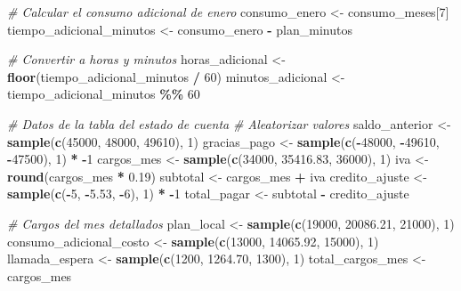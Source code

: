 \documentclass[
]{article}
\newenvironment{Shaded}{\begin{snugshade}}{\end{snugshade}}
\newcommand{\CommentTok}[1]{\textcolor[rgb]{0.56,0.35,0.01}{\textit{#1}}}
\newcommand{\DecValTok}[1]{\textcolor[rgb]{0.00,0.00,0.81}{#1}}
\newcommand{\FloatTok}[1]{\textcolor[rgb]{0.00,0.00,0.81}{#1}}
\newcommand{\FunctionTok}[1]{\textcolor[rgb]{0.13,0.29,0.53}{\textbf{#1}}}
\newcommand{\NormalTok}[1]{#1}
\newcommand{\OtherTok}[1]{\textcolor[rgb]{0.56,0.35,0.01}{#1}}
\newcommand{\SpecialCharTok}[1]{\textcolor[rgb]{0.81,0.36,0.00}{\textbf{#1}}}
\begin{document}
\begin{Shaded}
\begin{Highlighting}[]
\CommentTok{\# Calcular el consumo adicional de enero}
\NormalTok{consumo\_enero }\OtherTok{\textless{}{-}}\NormalTok{ consumo\_meses[}\DecValTok{7}\NormalTok{]}
\NormalTok{tiempo\_adicional\_minutos }\OtherTok{\textless{}{-}}\NormalTok{ consumo\_enero }\SpecialCharTok{{-}}\NormalTok{ plan\_minutos}

\CommentTok{\# Convertir a horas y minutos}
\NormalTok{horas\_adicional }\OtherTok{\textless{}{-}} \FunctionTok{floor}\NormalTok{(tiempo\_adicional\_minutos }\SpecialCharTok{/} \DecValTok{60}\NormalTok{)}
\NormalTok{minutos\_adicional }\OtherTok{\textless{}{-}}\NormalTok{ tiempo\_adicional\_minutos }\SpecialCharTok{\%\%} \DecValTok{60}

\CommentTok{\# Datos de la tabla del estado de cuenta}
\CommentTok{\# Aleatorizar valores}
\NormalTok{saldo\_anterior }\OtherTok{\textless{}{-}} \FunctionTok{sample}\NormalTok{(}\FunctionTok{c}\NormalTok{(}\DecValTok{45000}\NormalTok{, }\DecValTok{48000}\NormalTok{, }\DecValTok{49610}\NormalTok{), }\DecValTok{1}\NormalTok{)}
\NormalTok{gracias\_pago }\OtherTok{\textless{}{-}} \FunctionTok{sample}\NormalTok{(}\FunctionTok{c}\NormalTok{(}\SpecialCharTok{{-}}\DecValTok{48000}\NormalTok{, }\SpecialCharTok{{-}}\DecValTok{49610}\NormalTok{, }\SpecialCharTok{{-}}\DecValTok{47500}\NormalTok{), }\DecValTok{1}\NormalTok{) }\SpecialCharTok{*} \SpecialCharTok{{-}}\DecValTok{1}
\NormalTok{cargos\_mes }\OtherTok{\textless{}{-}} \FunctionTok{sample}\NormalTok{(}\FunctionTok{c}\NormalTok{(}\DecValTok{34000}\NormalTok{, }\FloatTok{35416.83}\NormalTok{, }\DecValTok{36000}\NormalTok{), }\DecValTok{1}\NormalTok{)}
\NormalTok{iva }\OtherTok{\textless{}{-}} \FunctionTok{round}\NormalTok{(cargos\_mes }\SpecialCharTok{*} \FloatTok{0.19}\NormalTok{)}
\NormalTok{subtotal }\OtherTok{\textless{}{-}}\NormalTok{ cargos\_mes }\SpecialCharTok{+}\NormalTok{ iva}
\NormalTok{credito\_ajuste }\OtherTok{\textless{}{-}} \FunctionTok{sample}\NormalTok{(}\FunctionTok{c}\NormalTok{(}\SpecialCharTok{{-}}\DecValTok{5}\NormalTok{, }\SpecialCharTok{{-}}\FloatTok{5.53}\NormalTok{, }\SpecialCharTok{{-}}\DecValTok{6}\NormalTok{), }\DecValTok{1}\NormalTok{) }\SpecialCharTok{*} \SpecialCharTok{{-}}\DecValTok{1}
\NormalTok{total\_pagar }\OtherTok{\textless{}{-}}\NormalTok{ subtotal }\SpecialCharTok{{-}}\NormalTok{ credito\_ajuste}

\CommentTok{\# Cargos del mes detallados}
\NormalTok{plan\_local }\OtherTok{\textless{}{-}} \FunctionTok{sample}\NormalTok{(}\FunctionTok{c}\NormalTok{(}\DecValTok{19000}\NormalTok{, }\FloatTok{20086.21}\NormalTok{, }\DecValTok{21000}\NormalTok{), }\DecValTok{1}\NormalTok{)}
\NormalTok{consumo\_adicional\_costo }\OtherTok{\textless{}{-}} \FunctionTok{sample}\NormalTok{(}\FunctionTok{c}\NormalTok{(}\DecValTok{13000}\NormalTok{, }\FloatTok{14065.92}\NormalTok{, }\DecValTok{15000}\NormalTok{), }\DecValTok{1}\NormalTok{)}
\NormalTok{llamada\_espera }\OtherTok{\textless{}{-}} \FunctionTok{sample}\NormalTok{(}\FunctionTok{c}\NormalTok{(}\DecValTok{1200}\NormalTok{, }\FloatTok{1264.70}\NormalTok{, }\DecValTok{1300}\NormalTok{), }\DecValTok{1}\NormalTok{)}
\NormalTok{total\_cargos\_mes }\OtherTok{\textless{}{-}}\NormalTok{ cargos\_mes}


\end{Highlighting}
\end{Shaded}
\end{document}
